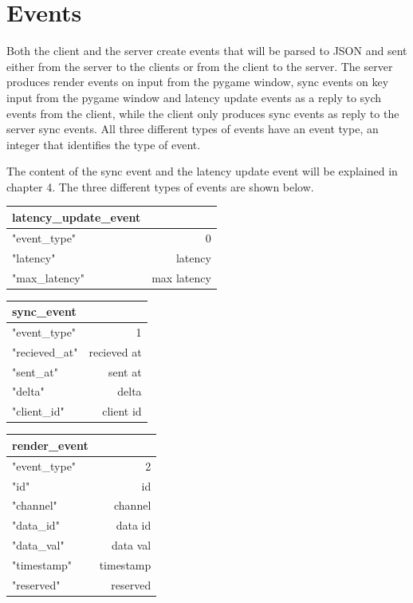 \section{Events}
\label{events}
Both the client and the server create events that will be parsed to JSON and sent either from the server to the clients or from the client to the server. The server produces render events on input from the pygame window, sync events on key input from the pygame window and latency update events as a reply to sych events from the client, while the client only produces sync events as reply to the server sync events. All three different types of events have an event type, an integer that identifies the type of event.

The content of the sync event and the latency update event will be explained in chapter 4. The three different types of events are shown below. 

\begin{tabular}{ l | r }
  latency\_update\_event \\
  \hline                        
  "event\_type" & 0 \\
  "latency" & latency \\
  "max\_latency" & max latency \\
  \hline  
\end{tabular}

\begin{tabular}{ l | r }
  sync\_event \\
  \hline                        
  "event\_type" & 1 \\
  "recieved\_at" & recieved at \\
  "sent\_at" & sent at \\
  "delta" & delta \\
  "client\_id" & client id \\
  \hline  
\end{tabular}

\begin{tabular}{ l | r }
  render\_event \\
  \hline                        
  "event\_type" & 2 \\
  "id" & id \\
  "channel" & channel \\
  "data\_id" & data id \\
  "data\_val" & data val \\
  "timestamp" & timestamp \\
  "reserved" & reserved \\
  \hline  
\end{tabular}

